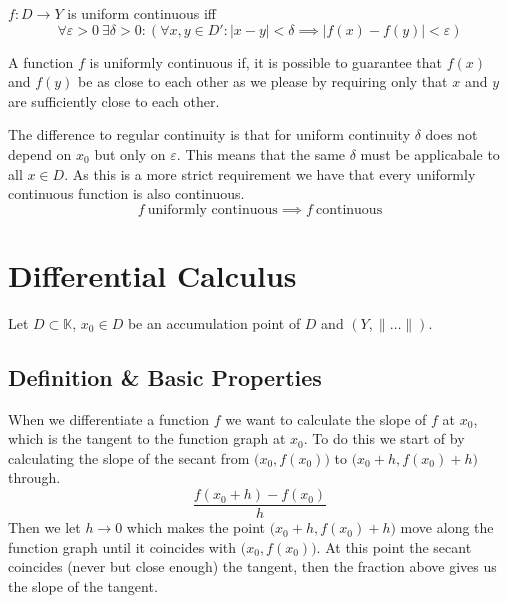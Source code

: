 \begin{definition}
   \(f: D \to Y\) is uniform continuous iff
   \[\forall \varepsilon > 0~\exists \delta > 0: (\forall x,y \in D': |x - y| < \delta \implies |f(x) - f(y)| < \varepsilon)\]
\end{definition}
\begin{remark}[Intuition]
   A function \(f\) is uniformly continuous if, it is possible to guarantee that \(f(x)\) and \(f(y)\) be as close to each other as we please by requiring only that \(x\) and \(y\) are sufficiently close to each other.
\end{remark}
\begin{remark}
   The difference to regular continuity is that for uniform continuity \(\delta\) does not depend on \(x_0\) but only on \(\varepsilon\).
   This means that the same \(\delta\) must be applicabale to all \(x \in D\).
   As this is a more strict requirement we have that every uniformly continuous function is also continuous.
   \[f~\text{uniformly continuous} \implies f~\text{continuous}\]
\end{remark}

\newpage

\section{Differential Calculus}
Let \(D \subset \mathbb{K}\), \(x_0 \in D\) be an accumulation point of \(D\) and \((Y, \|\ldots\|)\).

\subsection{Definition \& Basic Properties}
When we differentiate a function \(f\) we want to calculate the slope of \(f\) at \(x_0\), which is the tangent to the function graph at \(x_0\).
To do this we start of by calculating the slope of the secant from \(\big(x_0, f(x_0)\big)\) to \(\big(x_0 + h, f(x_0) + h\big)\) through.
\[\frac{f(x_0 + h) - f(x_0)}{h}\]
Then we let \(h \to 0\) which makes the point \(\big(x_0 + h, f(x_0) + h\big)\) move along the function graph until it coincides with \(\big(x_0, f(x_0)\big)\).
At this point the secant coincides (never but close enough) the tangent, then the fraction above gives us the slope of the tangent.
\begin{center}
   
\end{center}

